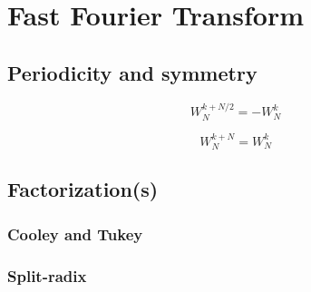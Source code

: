 \section{Fast Fourier Transform}

\subsection{Periodicity and symmetry}

\begin{equation}
    W^{k + N/2}_N = -W^k_N
\end{equation}

\begin{equation}
    W^{k + N}_N = W^k_N
\end{equation}

\subsection{Factorization(s)}

\subsubsection{Cooley and Tukey}

\subsubsection{Split-radix}

